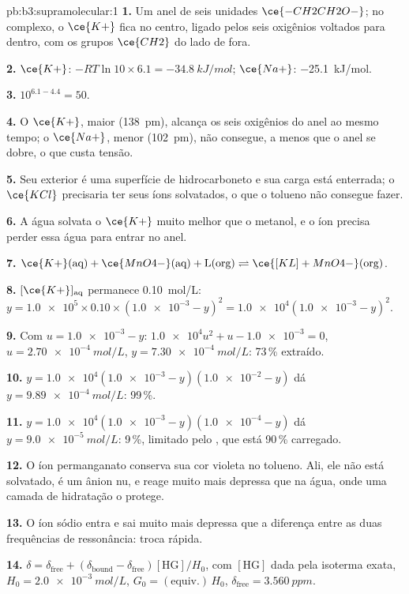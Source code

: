 \begin{solution}{pb:b3:supramolecular:1}
\textbf{1.} Um anel de seis unidades $\ce{-CH2CH2O-}$; no complexo, o $\ce{K+}$ fica no centro, ligado pelos
seis oxigênios voltados para dentro, com os grupos $\ce{CH2}$ do lado de fora.

\textbf{2.} $\ce{K+}$: $-RT\ln 10 \times 6.1 = \qty{-34.8}{kJ/mol}$; $\ce{Na+}$: \qty{-25.1}{kJ/mol}.

\textbf{3.} $10^{6.1 - 4.4} = 50$.

\textbf{4.} O $\ce{K+}$, maior (\qty{138}{pm}), alcança os seis oxigênios do anel ao mesmo tempo; o
$\ce{Na+}$, menor (\qty{102}{pm}), não consegue, a menos que o anel se dobre, o que custa tensão.

\textbf{5.} Seu exterior é uma superfície de hidrocarboneto e sua carga está enterrada; o $\ce{KCl}$
precisaria ter seus íons solvatados, o que o tolueno não consegue fazer.

\textbf{6.} A água solvata o $\ce{K+}$ muito melhor que o metanol, e o íon precisa perder essa
água para entrar no anel.

\textbf{7.} $\ce{K+}(\text{aq}) + \ce{MnO4-}(\text{aq}) + \mathrm L(\text{org}) \rightleftharpoons \ce{[KL]+MnO4-}(\text{org})$.

\textbf{8.} $[\ce{K+}]_{\mathrm{aq}}$ permanece \qty{0.10}{mol/L}: $y = \num{1.0e5} \times 0.10 \times (\num{1.0e-3} - y)^2 = \num{1.0e4}(\num{1.0e-3} - y)^2$.

\textbf{9.} Com $u = \num{1.0e-3} - y$: $\num{1.0e4}u^2 + u - \num{1.0e-3} = 0$, $u = \qty{2.70e-4}{mol/L}$, $y = \qty{7.30e-4}{mol/L}$: 73\,\%
extraído.

\textbf{10.} $y = \num{1.0e4}(\num{1.0e-3} - y)(\num{1.0e-2} - y)$ dá $y = \qty{9.89e-4}{mol/L}$: 99\,\%.

\textbf{11.} $y = \num{1.0e4}(\num{1.0e-3} - y)(\num{1.0e-4} - y)$ dá $y = \qty{9.0e-5}{mol/L}$: 9\,\%, limitado pelo ,
que está 90\,\% carregado.

\textbf{12.} O íon permanganato conserva sua cor violeta no tolueno. Ali,
ele não está solvatado, é um ânion nu, e reage muito mais depressa que na água, onde uma
camada de hidratação o protege.

\textbf{13.} O íon sódio entra e sai muito mais depressa que a diferença entre as
duas frequências de ressonância: troca rápida.

\textbf{14.} $\delta = \delta_{\mathrm{free}} + (\delta_{\mathrm{bound}} - \delta_{\mathrm{free}})[\mathrm{HG}]/H_0$, com $[\mathrm{HG}]$ dada pela isoterma exata, $H_0 = \qty{2.0e-3}{mol/L}$,
$G_0 = (\text{equiv.})\,H_0$, $\delta_{\mathrm{free}} = \qty{3.560}{ppm}$.


\end{solution}
